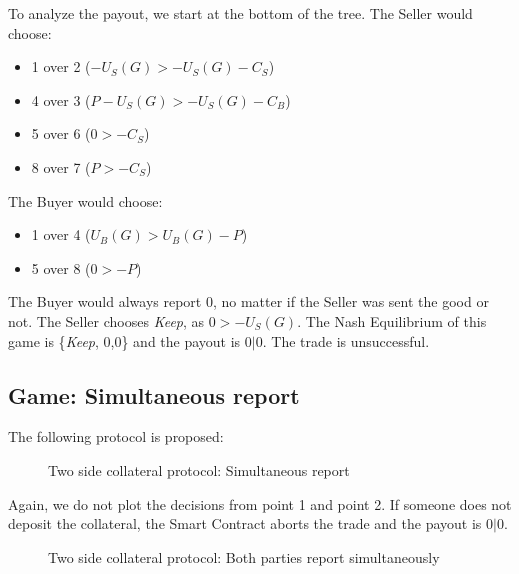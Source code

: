 \documentclass{cacthesis}
\begin{document}
To analyze the payout, we start at the bottom of the tree. The Seller would choose:
\begin{itemize}
    \item 1 over 2 ($-U_S(G) > -U_S(G) -C_S$)
    \item 4 over 3 ($P -U_S(G) > -U_S(G) -C_B$)
    \item 5 over 6 ($0 > -C_S$)
    \item 8 over 7 ($P >-C_S$)
\end{itemize}
The Buyer would choose:
\begin{itemize}
    \item 1 over 4 ($U_B(G) > U_B(G) - P$)
    \item 5 over 8 ($0 > -P$)
\end{itemize}
The Buyer would always report 0, no matter if the Seller was sent the good or not.
The Seller chooses \emph{Keep}, as $0>-U_S(G)$. The Nash Equilibrium of this game is \{\emph{Keep}, 0,0\} and the payout is $0|0$. The trade is unsuccessful.\newpage

\subsection{Game: Simultaneous report}
The following protocol is proposed:
\begin{figure}[htb!]
    \centering
    \caption{Two side collateral protocol: Simultaneous report}
    \label{pro:two-side-collateral-simultaneous}
\end{figure}

Again, we do not plot the decisions from point 1 and point 2. If someone does not deposit the collateral, the Smart Contract aborts the trade and the payout is $0|0$.\newline
\begin{figure}[htb!]
    \centering
    \caption{Two side collateral protocol: Both parties report simultaneously}
\end{figure}
\end{document}
